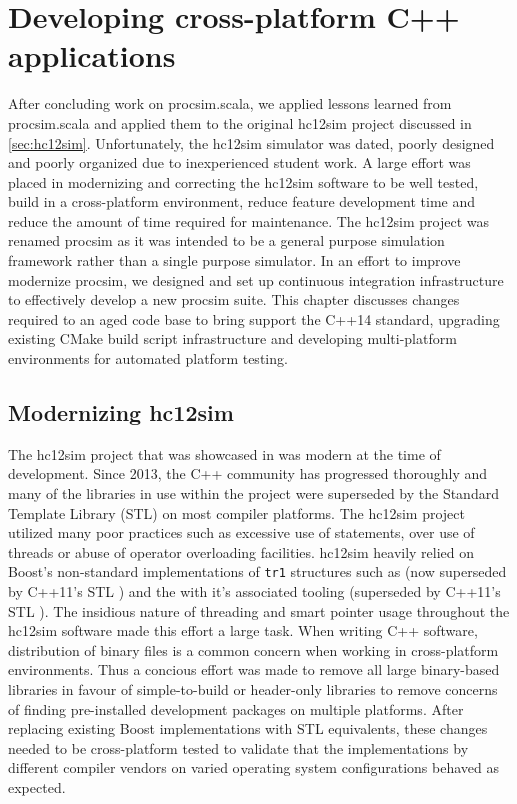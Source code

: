 \chapter{Developing cross-platform C++ applications}
\label{ch:cross-platform}

\newcommand{\cmakeinline}[1]{\texttt{#1}}
    
After concluding work on procsim.scala, we applied lessons learned from procsim.scala and applied them to the original hc12sim project discussed in \cref{sec:hc12sim}. Unfortunately, the hc12sim simulator was dated, poorly designed and poorly organized due to inexperienced student work. A large effort was placed in modernizing and correcting the hc12sim software to be well tested, build in a cross-platform environment, reduce feature development time and reduce the amount of time required for maintenance. The hc12sim project was renamed procsim as it was intended to be a general purpose simulation framework rather than a single purpose \hcmodel{} simulator. In an effort to improve modernize procsim, we designed and set up continuous integration infrastructure to effectively develop a new procsim suite. This chapter discusses changes required to an aged code base to bring support the C++14 standard, upgrading existing CMake \cite{Kitware:CMake} build script infrastructure and developing multi-platform environments for automated platform testing.

\section{Modernizing hc12sim}
\label{sec:cross-platform:sec:modernizing}

The hc12sim project that was showcased in \cite{Brightwell2013} was modern at the time of development. Since 2013, the C++ community has progressed thoroughly and many of the libraries in use within the project were superseded by the Standard Template Library (STL) on most compiler platforms. The hc12sim project utilized many poor practices such as excessive use of  statements, over use of threads or abuse of operator overloading facilities. hc12sim heavily relied on Boost's non-standard implementations of \verb|tr1| structures such as  \cite{Boost1.53.0:SmartPointers} (now superseded by C++11's STL  \cite{cppreference:shared-ptr}) and the  with it's associated tooling \cite{Boost1.53.0:Thread} (superseded by C++11's STL  \cite{cppreference:thread}). The insidious nature of threading and smart pointer usage throughout the hc12sim software made this effort a large task. When writing C++ software, distribution of binary files is a common concern when working in cross-platform environments. Thus a concious effort was made to remove all large binary-based libraries in favour of simple-to-build or header-only libraries to remove concerns of finding pre-installed development packages on multiple platforms. After replacing existing Boost implementations with STL equivalents, these changes needed to be cross-platform tested to validate that the implementations by different compiler vendors on varied operating system configurations behaved as expected.


